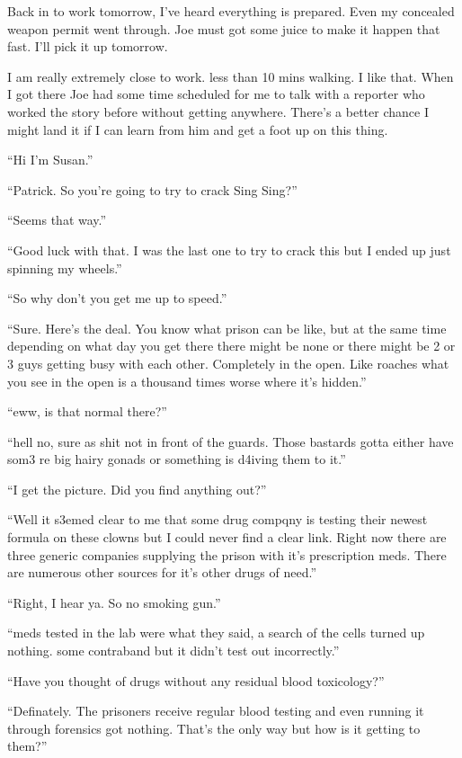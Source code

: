 Back in to work tomorrow, I've heard everything is prepared. Even my concealed weapon permit went through. Joe must got some juice to make it happen that fast. I'll pick it up tomorrow.

I am really extremely close to work. less than 10 mins walking. I like that. When I got there Joe had some time scheduled for me to talk with a reporter who worked the story before without getting anywhere. There's a better chance I might land it if I can learn from him and get a foot up on this thing.

``Hi I'm Susan.''

``Patrick. So you're going to try to crack Sing Sing?''

``Seems that way.''

``Good luck with that. I was the last one to try to crack this but I ended up just spinning my wheels.''

``So why don't you get me up to speed.''

``Sure. Here's the deal. You know what prison can be like, but at the same time depending on what day you get there there might be none or there might be 2 or 3 guys getting busy with each other. Completely in the open. Like roaches what you see in the open is a thousand times worse where it's hidden.''

``eww, is that normal there?''

``hell no, sure as shit not in front of the guards. Those bastards gotta either have som3 re big hairy gonads or something is d4iving them to it.''

``I get the picture. Did you find anything out?''

``Well it s3emed clear to me that some drug compqny is testing their newest formula on these clowns but I could never find a clear link. Right now there are three generic companies supplying the prison with it's prescription meds. There are numerous other sources for it's other drugs of need.''

``Right, I hear ya. So no smoking gun.''

``meds tested in the lab were what they said, a search of the cells turned up nothing. some contraband but it didn't test out incorrectly.''

``Have you thought of drugs without any residual blood toxicology?''

``Definately. The prisoners receive regular blood testing and even running it through forensics got nothing. That's the only way but how is it getting to them?''

